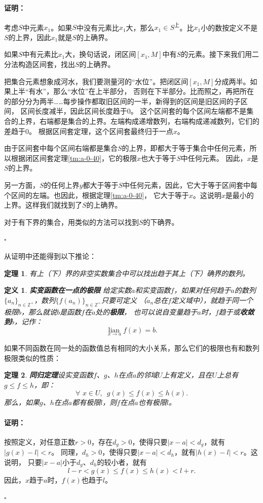 \documentclass[12pt,UTF8]{ctexbook}
\newcommand\lian[1]{
    \underset{#1}{\operatorname{lian}\,}
}
\newtheorem{df}{定义}[section]
\newtheorem{tm}{定理}[section]
\renewenvironment{proof}{\paragraph{\textbf{证明：}}}{\hfill$\square$}
\begin{document}
\begin{appendix}
\begin{proof}
    考虑$S$中元素$x_1$。如果$S$中没有元素比$x_1$大，那么$x_1\in S^{\text{上}}$。比$x_1$小的数按定义不是$S$的上界，因此$x_1$就是$S$的上确界。

    如果$S$中有元素比$x_1$大，换句话说，闭区间$[x_1, M]$中有$S$的元素。接下来我们用二分法构造区间套，找出$S$的上确界。

    把集合元素想象成河水，我们要测量河的“水位”。把闭区间$[x_1, M]$分成两半。如果上半“有水”，那么“水位”在上半部分，
    否则在下半部分。比而照之，再把所在的部分分为两半……每步操作都取旧区间的一半，新得到的区间是旧区间的子区间，
    区间长度减半，因此区间长度趋于$0$。
    这个区间套的每个区间左端都不是集合的上界，右端都是集合的上界。左端构成递增数列，右端构成递减数列，它们的差趋于$0$。
    根据区间套定理，这个区间套最终归于一点$x$。

    由于区间套中每个区间右端都是集合$S$的上界，即都大于等于集合中任何元素，所以根据闭区间套定理\ref{tm:a-0-40}，它的极限$x$也大于等于$S$中任何元素。
    因此，$x$是$S$的上界。
    
    另一方面，$S$的任何上界$y$都大于等于$S$中任何元素，因此，它大于等于区间套中每个区间的左端。也因此，根据定理\ref{tm:a-0-40}，
    它大于等于$x$。这说明$x$是最小的上界。这样我们就找到了$S$的上确界。

    对于有下界的集合，用类似的方法可以找到$S$的下确界。

\end{proof}

从证明中还能得到以下推论：
\begin{tm}\label{tm:b-0-5}
    有上（下）界的非空实数集合中可以找出趋于其上（下）确界的数列。
\end{tm}

\begin{df}\textbf{实变函数在一点的极限}
    给定实数$a$和实变函数$f$，如果对任何趋于$a$的数列$\{a_n\}_{n\in\mathbb{Z}^+}$，数列$\{f(a_n)\}_{n\in\mathbb{Z}^+}$只要可定义
    （$a_n$总在$f$定义域中），就趋于同一个极限$b$，那么就说$b$是函数$f$在$a$处的\textbf{极限}，
    也可以说自变量趋于$a$时，$f$趋于或\textbf{收敛到}$b$，记作：
    $$  \lian{x \to a} f(x) = b. $$
\end{df}

如果不同函数在同一处的函数值总有相同的大小关系，那么它们的极限也有和数列极限类似的性质：
\begin{tm}{\textbf{同归定理}}\label{tm:b-0-20}
    设实变函数$f$、$g$、$h$在点$a$的邻域$U$上有定义，且在$U$上总有$g \leqslant f \leqslant h $，即：
    $$ \forall \,\,x\in U,\,\,\, g(x) \leqslant f(x) \leqslant h(x).  $$
    那么，如果$g$、$h$在点$a$都有极限$l$，则$f$在点$a$也有极限$l$。
\end{tm}
\begin{proof}
    按照定义，对任意正数$r>0$，存在$d_g>0$，使得只要$|x - a| < d_g$，就有$|g(x) - l| < r$。
    同理，$d_h>0$，使得只要$|x - a| < d_h$，就有$|h(x) - l| < r$。这说明，
    只要$|x - a|$小于$d_g$、$d_h$的较小者，就有
    $$ l - r < g(x) \leqslant f(x) \leqslant h(x) < l + r. $$
    因此，$x$趋于$a$时，$f(x)$也趋于$l$。


\end{proof}
\end{appendix}
\end{document}
